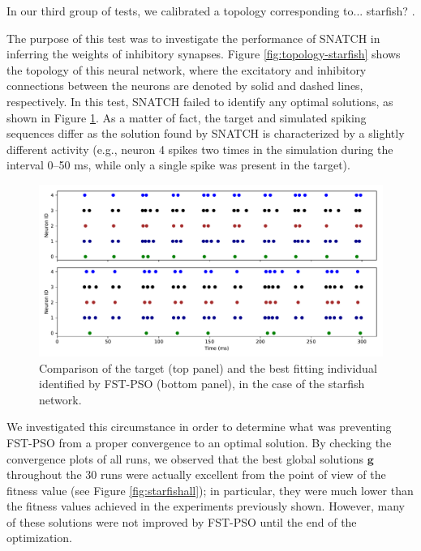 \documentclass[utf8]{frontiersFPHY} %
\newcommand {\name}{SNATCH}
\begin{document}
In our third group of tests, we calibrated a topology corresponding to...  starfish? \cite{suzuki1971dynamics}.

The purpose of this test was to investigate the performance of \name{} in  inferring the weights of inhibitory synapses. 
Figure \ref{fig:topology-starfish} shows the topology of this neural network, where the excitatory and inhibitory connections between the neurons are denoted by solid and dashed lines, respectively.
In this test, \name{} failed
to identify any optimal solutions, as shown in Figure \ref{fig:target-stellona}. 
As a matter of fact, the target and simulated spiking sequences differ as the solution found by \name{} is characterized by a slightly different activity (e.g., neuron 4 spikes two times in the simulation during the interval 0--50 ms, while only a single spike was present in the target).

\begin{figure}[!ht]
	\centering
	\includegraphics[width=\textwidth]{images/failed-starfish/target_sim.pdf}
	\caption{Comparison of the target (top panel) and the best fitting individual identified by FST-PSO (bottom panel), in the case of the starfish network. }
	\label{fig:target-stellona}
\end{figure}

We investigated this circumstance in order to determine what was preventing FST-PSO
from a proper convergence to an optimal solution. 
By checking the convergence plots of all runs, we observed that the best global solutions $\textbf{g}$ throughout the 30 runs were actually excellent from the point of view of the fitness value (see Figure \ref{fig:starfishall}); in particular, they were much lower than the fitness values achieved in the experiments previously shown. 
However, many of these solutions were not improved by FST-PSO until the end of the optimization.
\end{document}
